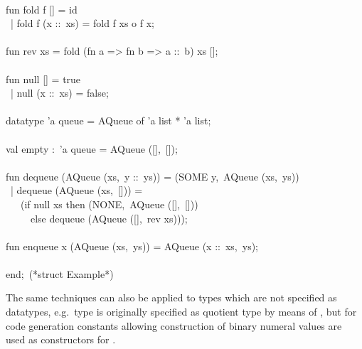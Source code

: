 \begin{isabellebody}
\begin{isamarkuptext}
\hspace*{0pt}\\
\hspace*{0pt}fun fold f [] = id\\
\hspace*{0pt} ~| fold f (x ::~xs) = fold f xs o f x;\\
\hspace*{0pt}\\
\hspace*{0pt}fun rev xs = fold (fn a => fn b => a ::~b) xs [];\\
\hspace*{0pt}\\
\hspace*{0pt}fun null [] = true\\
\hspace*{0pt} ~| null (x ::~xs) = false;\\
\hspace*{0pt}\\
\hspace*{0pt}datatype 'a queue = AQueue of 'a list * 'a list;\\
\hspace*{0pt}\\
\hspace*{0pt}val empty :~'a queue = AQueue ([],~[]);\\
\hspace*{0pt}\\
\hspace*{0pt}fun dequeue (AQueue (xs,~y ::~ys)) = (SOME y,~AQueue (xs,~ys))\\
\hspace*{0pt} ~| dequeue (AQueue (xs,~[])) =\\
\hspace*{0pt} ~~~(if null xs then (NONE,~AQueue ([],~[]))\\
\hspace*{0pt} ~~~~~else dequeue (AQueue ([],~rev xs)));\\
\hspace*{0pt}\\
\hspace*{0pt}fun enqueue x (AQueue (xs,~ys)) = AQueue (x ::~xs,~ys);\\
\hspace*{0pt}\\
\hspace*{0pt}end;~(*struct Example*)%
\end{isamarkuptext}%
\isamarkuptrue%
%
\endisatagquote
{\isafoldquote}%
%
\isadelimquote
%
\endisadelimquote
%
\begin{isamarkuptext}%
The same techniques can also be applied to types which are not
  specified as datatypes, e.g.~type  is originally specified
  as quotient type by means of \hypertarget{command.typedef}{\hyperlink{command.typedef}{\mbox{}}}, but for code
  generation constants allowing construction of binary numeral values
  are used as constructors for .


\end{isamarkuptext}
\end{isabellebody}
